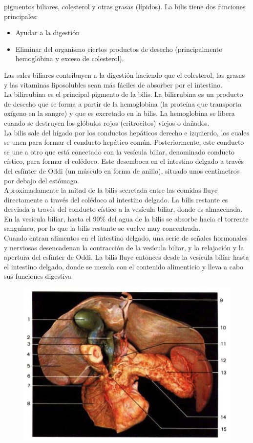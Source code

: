 pigmentos biliares, colesterol y otras grasas (lípidos). La bilis tiene dos funciones principales:\\
\begin{itemize}
    \item Ayudar a la digestión
    \item Eliminar del organismo ciertos productos de desecho (principalmente hemoglobina y exceso de colesterol).    
\end{itemize}
Las sales biliares contribuyen a la digestión haciendo que el colesterol, las grasas y las vitaminas liposolubles sean más fáciles de absorber por el intestino.\\
La bilirrubina es el principal pigmento de la bilis. La bilirrubina es un producto de desecho que se forma a partir de la hemoglobina (la proteína que transporta 
oxígeno en la sangre) y que es excretado en la bilis. La hemoglobina se libera cuando se destruyen los glóbulos rojos (eritrocitos) viejos o dañados.\\
La bilis sale del hígado por los conductos hepáticos derecho e izquierdo, los cuales se unen para formar el conducto hepático común. Posteriormente, este conducto 
se une a otro que está conectado con la vesícula biliar, denominado conducto cístico, para formar el colédoco. Este desemboca en el intestino delgado a través del 
esfínter de Oddi (un músculo en forma de anillo), situado unos centímetros por debajo del estómago.\\
Aproximadamente la mitad de la bilis secretada entre las comidas fluye directamente a través del colédoco al intestino delgado. La bilis restante es desviada a 
través del conducto cístico a la vesícula biliar, donde es almacenada. En la vesícula biliar, hasta el 90\% del agua de la bilis se absorbe hacia el torrente sanguíneo, 
por lo que la bilis restante se vuelve muy concentrada.\\
Cuando entran alimentos en el intestino delgado, una serie de señales hormonales y nerviosas desencadenan la contracción de la vesícula biliar, y la relajación y la apertura del 
esfínter de Oddi. La bilis fluye entonces desde la vesícula biliar hasta el intestino delgado, donde se mezcla con el contenido alimenticio y lleva a cabo sus funciones digestiva\\
\begin{figure}[H]
	\begin{center}
 		\includegraphics[width = .7\textwidth]{v2/images/image20.png}
	\end{center} 
\end{figure}
